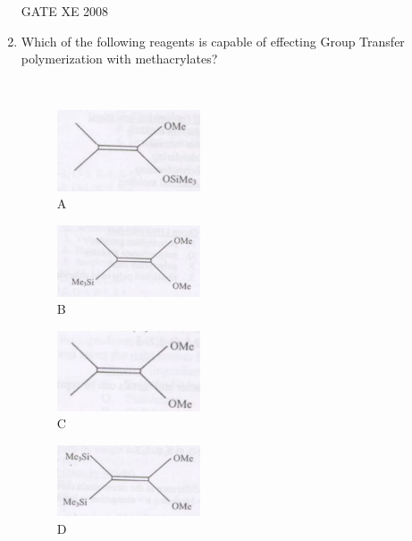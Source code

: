 \documentclass[12pt]{article}
\begin{document}
\begin{enumerate}[label=Q\arabic*.]
 GATE XE 2008

\item Which of the following reagents is capable of effecting Group Transfer polymerization with methacrylates?  

\
\begin{multicols}{2}
 \begin{figure}[H]
    \includegraphics[width=0.4\textwidth]{figs/ass1_h_q11_1.png}
    \caption{A}
    \end{figure}
    
  \begin{figure}[H]
    \includegraphics[width=0.4\textwidth]{figs/ass1_h_q11_2.png}
    \caption{B}
    \end{figure}
 
  \begin{figure}[H]
    \includegraphics[width=0.4\textwidth]{figs/ass1_h_q11_3.png}
    \caption{C}
    \end{figure}
    
  \begin{figure}[H]
    \includegraphics[width=0.4\textwidth]{figs/ass1_h_q11_4.png}
    \caption{D}
    \end{figure}
\end{multicols}    



\end{enumerate}
\end{document}
